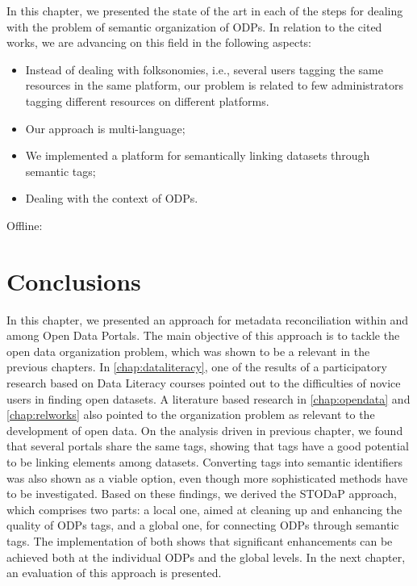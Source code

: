 In this chapter, we presented the state of the art in each of the steps for dealing with the problem of semantic organization of ODPs.
In relation to the cited works, we are advancing on this field in the following aspects:
\begin{itemize}
	\item Instead of dealing with folksonomies, i.e., several users tagging the same resources in the same platform, our problem is related to few administrators tagging different resources on different platforms.
	\item Our approach is multi-language;
	\item We implemented a platform for semantically linking datasets through semantic tags;
	\item Dealing with the context of ODPs.
\end{itemize}

Offline: 
\cite{Passant2008}

\section{Conclusions}
\label{sec:stodap_conclusions}

In this chapter, we presented an approach for metadata reconciliation within and among Open Data Portals.
The main objective of this approach is to tackle the open data organization problem, which was shown to be a relevant in the previous chapters.
In \autoref{chap:dataliteracy}, one of the results of a participatory research based on Data Literacy courses pointed out to the difficulties of novice users in finding open datasets.
A literature based research in \autoref{chap:opendata} and \autoref{chap:relworks} also pointed to the organization problem as relevant to the development of open data.
On the analysis driven in previous chapter, we found that several portals share the same tags, showing that tags have a good potential to be linking elements among datasets.
Converting tags into semantic identifiers was also shown as a viable option, even though more sophisticated methods have to be investigated. 
Based on these findings, we derived the STODaP approach, which comprises two parts: 
a local one, aimed at cleaning up and enhancing the quality of ODPs tags, and 
a global one, for connecting ODPs through semantic tags.
The implementation of both shows that significant enhancements can be achieved both at the individual ODPs and the global levels.
In the next chapter, an evaluation of this approach is presented.




